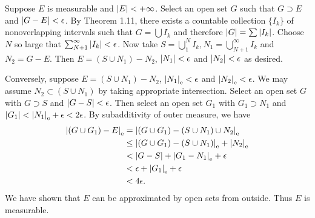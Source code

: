 
\begin{exercise}{3.11}
  Suppose $E$ is measurable and $\left\vert E\right\vert < + \infty$.
  Select an open set $G$ such that $G \supset E$ and $\left\vert G-E\right\vert < \epsilon$.
  By Theorem 1.11, there exists a countable collection $\{I_k\}$
  of nonoverlapping intervals such that $G = \bigcup I_k$
  and therefore $\left\vert G\right\vert = \sum \left\vert I_k\right\vert$.
  Choose $N$ so large that $\sum_{N+1}^{\infty} \left\vert I_k\right\vert < \epsilon$.
  Now take $S = \bigcup_1^N I_k, N_1 = \bigcup_{N+1}^\infty I_k$
  and $N_2 = G - E$.
  Then $E = (S \cup N_1) - N_2$, $\left\vert N_1\right\vert < \epsilon$ and $\left\vert N_2\right\vert < \epsilon$
  as desired.

  Conversely, suppose $E = (S \cup N_1) - N_2$,
  $\left\vert N_1\right\vert_\mathrm{e} < \epsilon$ and $\left\vert N_2\right\vert_\mathrm{e} < \epsilon$.
  We may assume $N_2 \subset (S \cup N_1)$ by taking appropriate intersection.
  Select an open set $G$ with $G \supset S$ and $\left\vert G - S\right\vert < \epsilon$.
  Then select an open set $G_1$ with $G_1 \supset N_1$
  and $\left\vert G_1\right\vert < \left\vert N_1\right\vert_\mathrm{e} + \epsilon < 2 \epsilon$.
  By subadditivity of outer measure, we have
  \[
    \begin{aligned}
      \left\vert(G \cup G_1) - E\right\vert_\mathrm{e} &= \left\vert(G \cup G_1) - (S \cup N_1) \cup N_2\right\vert_\mathrm{e} \\
      &\le \left\vert(G \cup G_1) - (S \cup N_1)\right\vert_\mathrm{e} + \left\vert N_2\right\vert_\mathrm{e} \\
      &< \left\vert G-S\right\vert + \left\vert G_1 - N_1\right\vert_\mathrm{e} + \epsilon \\
      &< \epsilon + \left\vert G_1\right\vert_\mathrm{e} + \epsilon \\
      &< 4\epsilon.
    \end{aligned}
  \]
  We have shown that $E$ can be approximated by open sets from outside.
  Thus $E$ is measurable.
\end{exercise}

